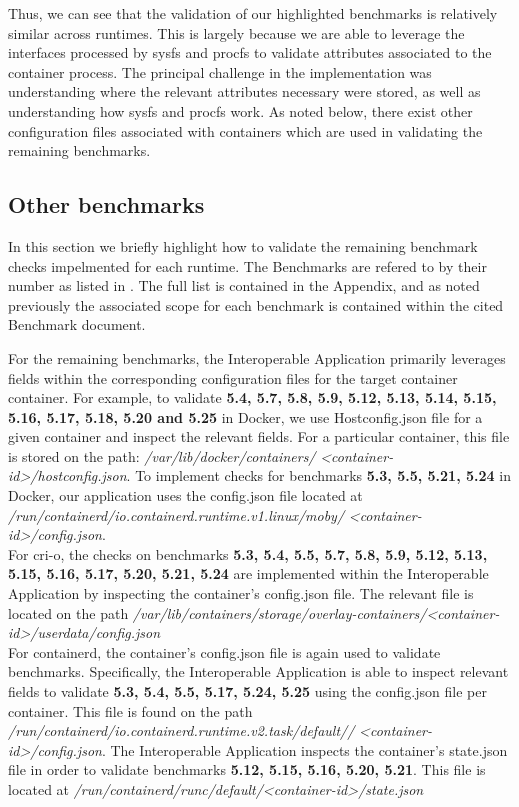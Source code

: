 \documentclass[times, twoside, watermark]{zHenriquesLab-StyleBioRxiv}
\begin{document}
Thus, we can see that the validation of our highlighted benchmarks is relatively similar across runtimes. This is largely because we are able to leverage the interfaces processed by sysfs and procfs to validate attributes associated to the container process. The principal challenge in the implementation was understanding where the relevant attributes necessary were stored, as well as understanding how sysfs and procfs work. As noted below, there exist other configuration files associated with containers which are used in validating the remaining benchmarks.

\subsection*{Other benchmarks}

In this section we briefly highlight how to validate the remaining benchmark checks impelmented for each runtime. The Benchmarks are refered to by their number as listed in \cite[Ch. 5]{center_for_internet_security}. The full list is contained in the Appendix, and as noted previously the associated scope for each benchmark is contained within the cited Benchmark document. 

For the remaining benchmarks, the Interoperable Application primarily leverages fields within the corresponding configuration files for the target container container. For example, to validate \textbf{5.4, 5.7, 5.8, 5.9, 5.12, 5.13, 5.14, 5.15, 5.16, 5.17, 5.18, 5.20 and 5.25} in Docker, we use Hostconfig.json file for a given container and inspect the relevant fields. For a particular container, this file is stored on the path: \textit{/var/lib/docker/containers/} \textit{<container-id>/hostconfig.json}. To implement checks for benchmarks \textbf{5.3, 5.5, 5.21, 5.24} in Docker, our application uses the config.json file located at \textit{/run/containerd/io.containerd.runtime.v1.linux/moby/} \textit{<container-id>/config.json}.
\\

For cri-o, the checks on benchmarks \textbf{5.3, 5.4, 5.5, 5.7, 5.8, 5.9, 5.12, 5.13, 5.15, 5.16, 5.17, 5.20, 5.21, 5.24} are implemented within the Interoperable Application by inspecting the container's config.json file. The relevant file is located on the path \textit{/var/lib/containers/storage/overlay-containers/}\textit{<container-id>/userdata/config.json}
\\

For containerd, the container's config.json file is again used to validate benchmarks. Specifically, the Interoperable Application is able to inspect relevant fields to validate \textbf{5.3, 5.4, 5.5, 5.17, 5.24, 5.25} using the config.json file per container.
This file is found on the path \textit{/run/containerd/io.containerd.runtime.v2.task/default//} \textit{<container-id>/config.json}.
The Interoperable Application inspects the container's state.json file in order to validate benchmarks \textbf{5.12, 5.15, 5.16, 5.20, 5.21}.
This file is located at \textit{/run/containerd/runc/default/}\textit{<container-id>/state.json}
\end{document}
